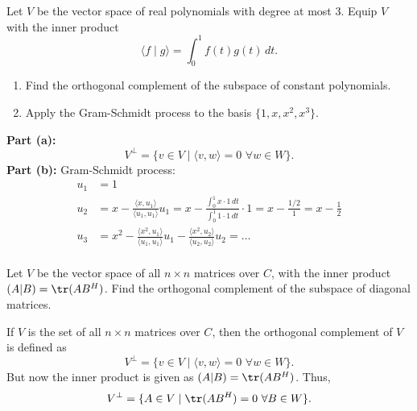 \documentclass[11pt]{article}
\begin{document}
\begin{homeworkProblem}

    Let $V$ be the vector space of real polynomials with degree at most 3. Equip $V$ with the inner product
    \[
        \langle f \mid g \rangle = \int_{0}^{1} f(t) g(t) \, dt.
    \]
    \begin{enumerate}[label=(\alph*), topsep=5pt, itemsep=5pt]
        \item Find the orthogonal complement of the subspace of constant polynomials.
        \item Apply the Gram-Schmidt process to the basis $\{1, x, x^2, x^3\}$. \newline
    \end{enumerate}
    \solution

    \textbf{Part (a):}
    \[
        V^{\perp} = \{ v \in V \mid \langle v, w \rangle = 0 \,\, \forall w \in W\}.
    \]
    \textbf{Part (b):} Gram-Schmidt process:
    \begin{align*}
        u_1 & = 1                                                                                                                                                                                                                                                          \\
        u_2 & = x - \frac{\langle x, u_1 \rangle}{\langle u_1, u_1 \rangle} u_1                                                                      = x - \frac{\int_{0}^{1} x \cdot 1 \, dt}{\int_{0}^{1} 1 \cdot 1 \, dt} \cdot 1 = x - \frac{1/2}{1} = x - \frac{1}{2} \\
        u_3 & = x^2 - \frac{\langle x^2, u_1 \rangle}{\langle u_1, u_1 \rangle} u_1 - \frac{\langle x^2, u_2 \rangle}{\langle u_2, u_2 \rangle} u_2 = \dots                                                                                                                \\
    \end{align*}
\end{homeworkProblem}

\pagebreak

\begin{homeworkProblem}

    Let $V$ be the vector space of all $n \times n$ matrices over $C$, with the inner product $(A|B) = \tr(AB^H)$.
    Find the orthogonal complement of the subspace of diagonal matrices. \\

    \solution

    If $V$ is the set of all \(n \times n\) matrices over \(C\), then the orthogonal complement of $V$ is defined as
    \[
        V^{\perp} = \{  v \in V \mid \langle v, w \rangle = 0 \,\, \forall w \in W\}.
    \]
    But now the inner product is given as \((A|B) = \tr(AB^H)\). Thus,
    \[
        V^{\perp} = \{ A \in V \mid \tr(AB^H) = 0 \,\, \forall B \in W\}.
    \]
\end{homeworkProblem}
\end{document}
